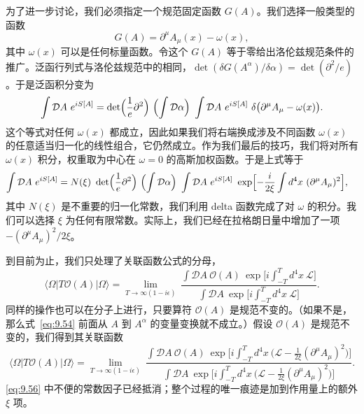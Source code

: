 为了进一步讨论，我们必须指定一个规范固定函数 $G(A)$。我们选择一般类型的函数
\begin{equation}
  G(A) = \partial^\mu A_\mu(x) - \omega(x) ,
  \label{eq:9.55}
\end{equation}
其中 $\omega(x)$ 可以是任何标量函数。令这个 $G(A)$ 等于零给出洛伦兹规范条件的推广。泛函行列式与洛伦兹规范中的相同，$\det(\delta G(A^\alpha)/\delta\alpha) = \det(\partial^2/e)$。于是泛函积分变为
\begin{equation}
  \int \mathcal{D}A\ e^{iS[A]} = \det\Bigl( \frac{1}{e}\partial^2 \Bigr)\
    \Bigl( \int \mathcal{D}\alpha \Bigr)\ \int \mathcal{D}A\ e^{iS[A]}\
    \delta\bigl( \partial^\mu A_\mu - \omega(x) \bigr) .
\end{equation}
这个等式对任何 $\omega(x)$ 都成立，因此如果我们将右端换成涉及不同函数 $\omega(x)$ 的任意适当归一化的线性组合，它仍然成立。作为我们最后的技巧，我们将对所有 $\omega(x)$ 积分，权重取为中心在 $\omega=0$ 的高斯加权函数。于是上式等于
\begin{equation}
  \begin{aligned}
    \int \mathcal{D}A\ e^{iS[A]} &= N(\xi)\ \det\Bigl( \frac{1}{e}\partial^2
      \Bigr)\ \Bigl( \int \mathcal{D}\alpha \Bigr)\ \int \mathcal{D}A\
      e^{iS[A]}\ \exp\Bigl[ -\frac{i}{2\xi}\int d^4x\
        (\partial^\mu A_\mu)^2 \Bigr] ,
  \end{aligned}
  \label{eq:9.56}
\end{equation}
其中 $N(\xi)$ 是不重要的归一化常数，我们利用 delta 函数完成了对 $\omega$ 的积分。我们可以选择 $\xi$ 为任何有限常数。实际上，我们已经在拉格朗日量中增加了一项 $-(\partial^\mu A_\mu)^2/2\xi$。

到目前为止，我们只处理了关联函数公式的分母，
\begin{equation}
  \langle\Omega|T\mathcal{O}(A)|\Omega\rangle
  = \lim_{T\to\infty(1-i\epsilon)}\
    \frac{\int\mathcal{D}A\ \mathcal{O}(A)\ \exp\bigl[
      i\int_{-T}^{T}d^4x\ \mathcal{L} \bigr]}
      {\int\mathcal{D}A\ \exp\bigl[ i\int_{-T}^{T}d^4x\ \mathcal{L} \bigr]} .
\end{equation}
同样的操作也可以在分子上进行，只要算符 $\mathcal{O}(A)$ 是规范不变的。（如果不是，那么式~\eqref{eq:9.54} 前面从 $A$ 到 $A^\alpha$ 的变量变换就不成立。）假设 $\mathcal{O}(A)$ 是规范不变的，我们得到其关联函数
\begin{equation}
  \langle\Omega|T\mathcal{O}(A)|\Omega\rangle
  = \lim_{T\to\infty(1-i\epsilon)}\
    \frac{\int\mathcal{D}A\ \mathcal{O}(A)\ \exp\bigl[ i\int_{-T}^{T}d^4x\
      \bigl( \mathcal{L} - \frac{1}{2\xi}(\partial^\mu A_\mu)^2 \bigr)
      \bigr]}
      {\int\mathcal{D}A\ \exp\bigl[ i\int_{-T}^{T}d^4x\
        \bigl( \mathcal{L} - \frac{1}{2\xi}(\partial^\mu A_\mu)^2 \bigr)
        \bigr]} .
  \label{eq:9.57}
\end{equation}
\eqref{eq:9.56} 中不便的常数因子已经抵消；整个过程的唯一痕迹是加到作用量上的额外 $\xi$ 项。

